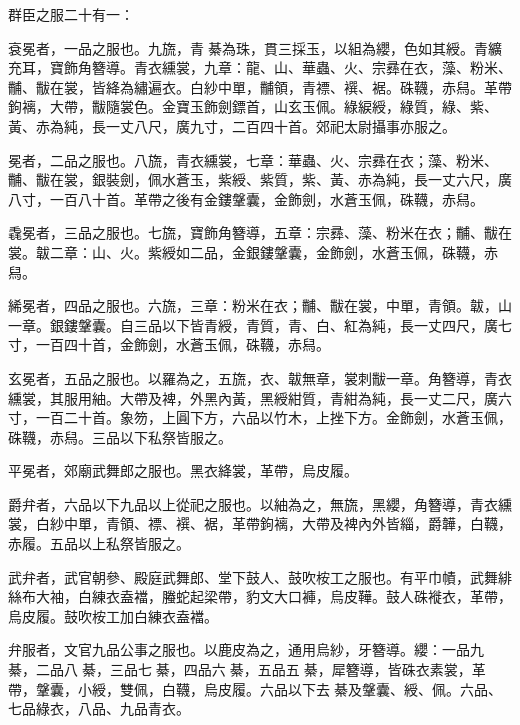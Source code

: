\begin{pinyinscope}
 群臣之服二十有一：



 袞冕者，一品之服也。九旒，青綦為珠，貫三採玉，以組為纓，色如其綬。青纊充耳，寶飾角簪導。青衣纁裳，九章：龍、山、華蟲、火、宗彞在衣，藻、粉米、黼、黻在裳，皆絳為繡遍衣。白紗中單，黼領，青褾、襈、裾。硃韈，赤舄。革帶鉤褵，大帶，黻隨裳色。金寶玉飾劍鏢首，山玄玉佩。綠綟綬，綠質，綠、紫、黃、赤為純，長一丈八尺，廣九寸，二百四十首。郊祀太尉攝事亦服之。



 冕者，二品之服也。八旒，青衣纁裳，七章：華蟲、火、宗彞在衣；藻、粉米、黼、黻在裳，銀裝劍，佩水蒼玉，紫綬、紫質，紫、黃、赤為純，長一丈六尺，廣八寸，一百八十首。革帶之後有金鏤鞶囊，金飾劍，水蒼玉佩，硃韈，赤舄。



 毳冕者，三品之服也。七旒，寶飾角簪導，五章：宗彞、藻、粉米在衣；黼、黻在裳。韍二章：山、火。紫綬如二品，金銀鏤鞶囊，金飾劍，水蒼玉佩，硃韈，赤舄。



 絺冕者，四品之服也。六旒，三章：粉米在衣；黼、黻在裳，中單，青領。韍，山一章。銀鏤鞶囊。自三品以下皆青綬，青質，青、白、紅為純，長一丈四尺，廣七寸，一百四十首，金飾劍，水蒼玉佩，硃韈，赤舄。



 玄冕者，五品之服也。以羅為之，五旒，衣、韍無章，裳刺黻一章。角簪導，青衣纁裳，其服用紬。大帶及裨，外黑內黃，黑綬紺質，青紺為純，長一丈二尺，廣六寸，一百二十首。象笏，上圓下方，六品以竹木，上挫下方。金飾劍，水蒼玉佩，硃韈，赤舄。三品以下私祭皆服之。



 平冕者，郊廟武舞郎之服也。黑衣絳裳，革帶，烏皮履。



 爵弁者，六品以下九品以上從祀之服也。以紬為之，無旒，黑纓，角簪導，青衣纁裳，白紗中單，青領、褾、襈、裾，革帶鉤褵，大帶及裨內外皆緇，爵韡，白韈，赤履。五品以上私祭皆服之。



 武弁者，武官朝參、殿庭武舞郎、堂下鼓人、鼓吹桉工之服也。有平巾幘，武舞緋絲布大袖，白練衣盍襠，螣蛇起梁帶，豹文大口褲，烏皮鞾。鼓人硃褷衣，革帶，烏皮履。鼓吹桉工加白練衣盍襠。



 弁服者，文官九品公事之服也。以鹿皮為之，通用烏紗，牙簪導。纓：一品九綦，二品八綦，三品七綦，四品六綦，五品五綦，犀簪導，皆硃衣素裳，革帶，鞶囊，小綬，雙佩，白韈，烏皮履。六品以下去綦及鞶囊、綬、佩。六品、七品綠衣，八品、九品青衣。




\end{pinyinscope}
